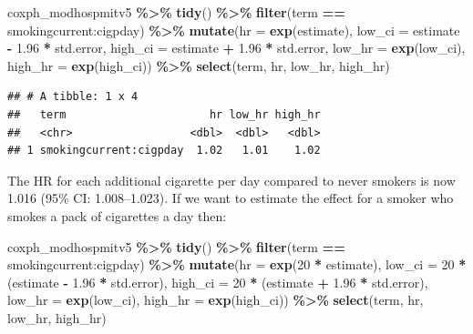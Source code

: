 \documentclass[
]{book}
\newenvironment{Shaded}{\begin{snugshade}}{\end{snugshade}}
\newcommand{\AttributeTok}[1]{\textcolor[rgb]{0.13,0.29,0.53}{#1}}
\newcommand{\DecValTok}[1]{\textcolor[rgb]{0.00,0.00,0.81}{#1}}
\newcommand{\FloatTok}[1]{\textcolor[rgb]{0.00,0.00,0.81}{#1}}
\newcommand{\FunctionTok}[1]{\textcolor[rgb]{0.13,0.29,0.53}{\textbf{#1}}}
\newcommand{\NormalTok}[1]{#1}
\newcommand{\SpecialCharTok}[1]{\textcolor[rgb]{0.81,0.36,0.00}{\textbf{#1}}}
\newcommand{\StringTok}[1]{\textcolor[rgb]{0.31,0.60,0.02}{#1}}
\begin{document}
\begin{Shaded}
\begin{Highlighting}[]
\NormalTok{coxph\_modhospmitv5 }\SpecialCharTok{\%\textgreater{}\%} 
  \FunctionTok{tidy}\NormalTok{() }\SpecialCharTok{\%\textgreater{}\%} 
  \FunctionTok{filter}\NormalTok{(term }\SpecialCharTok{==} \StringTok{\textquotesingle{}smokingcurrent:cigpday\textquotesingle{}}\NormalTok{) }\SpecialCharTok{\%\textgreater{}\%}
  \FunctionTok{mutate}\NormalTok{(}\AttributeTok{hr =} \FunctionTok{exp}\NormalTok{(estimate),}
         \AttributeTok{low\_ci =}\NormalTok{ estimate }\SpecialCharTok{{-}} \FloatTok{1.96} \SpecialCharTok{*}\NormalTok{ std.error, }
         \AttributeTok{high\_ci =}\NormalTok{ estimate }\SpecialCharTok{+} \FloatTok{1.96} \SpecialCharTok{*}\NormalTok{ std.error, }
         \AttributeTok{low\_hr =} \FunctionTok{exp}\NormalTok{(low\_ci), }
         \AttributeTok{high\_hr =} \FunctionTok{exp}\NormalTok{(high\_ci)) }\SpecialCharTok{\%\textgreater{}\%} 
  \FunctionTok{select}\NormalTok{(term, hr, low\_hr, high\_hr)}
\end{Highlighting}
\end{Shaded}

\begin{verbatim}
## # A tibble: 1 x 4
##   term                      hr low_hr high_hr
##   <chr>                  <dbl>  <dbl>   <dbl>
## 1 smokingcurrent:cigpday  1.02   1.01    1.02
\end{verbatim}

The HR for each additional cigarette per day compared to never smokers is now 1.016 (95\% CI: 1.008--1.023). If we want to estimate the effect for a smoker who smokes a pack of cigarettes a day then:

\begin{Shaded}
\begin{Highlighting}[]
\NormalTok{coxph\_modhospmitv5 }\SpecialCharTok{\%\textgreater{}\%} 
  \FunctionTok{tidy}\NormalTok{() }\SpecialCharTok{\%\textgreater{}\%} 
  \FunctionTok{filter}\NormalTok{(term }\SpecialCharTok{==} \StringTok{\textquotesingle{}smokingcurrent:cigpday\textquotesingle{}}\NormalTok{) }\SpecialCharTok{\%\textgreater{}\%}
  \FunctionTok{mutate}\NormalTok{(}\AttributeTok{hr =} \FunctionTok{exp}\NormalTok{(}\DecValTok{20} \SpecialCharTok{*}\NormalTok{ estimate),}
         \AttributeTok{low\_ci =} \DecValTok{20} \SpecialCharTok{*}\NormalTok{ (estimate }\SpecialCharTok{{-}} \FloatTok{1.96} \SpecialCharTok{*}\NormalTok{ std.error), }
         \AttributeTok{high\_ci =} \DecValTok{20} \SpecialCharTok{*}\NormalTok{ (estimate }\SpecialCharTok{+} \FloatTok{1.96} \SpecialCharTok{*}\NormalTok{ std.error), }
         \AttributeTok{low\_hr =} \FunctionTok{exp}\NormalTok{(low\_ci), }
         \AttributeTok{high\_hr =} \FunctionTok{exp}\NormalTok{(high\_ci)) }\SpecialCharTok{\%\textgreater{}\%} 
  \FunctionTok{select}\NormalTok{(term, hr, low\_hr, high\_hr)}
\end{Highlighting}
\end{Shaded}
\end{document}
